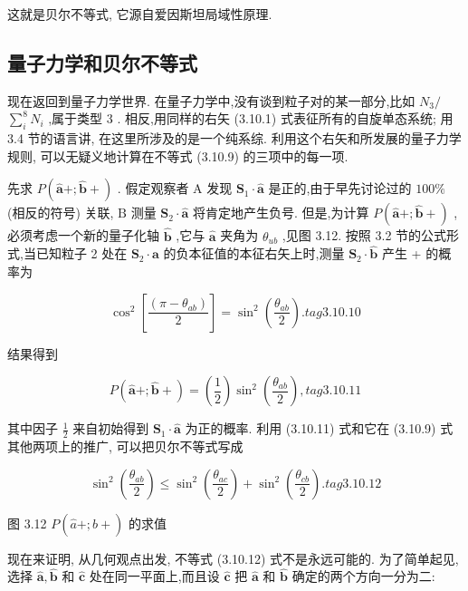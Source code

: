 这就是贝尔不等式, 它源自爱因斯坦局域性原理.

\subsection{量子力学和贝尔不等式}

现在返回到量子力学世界. 在量子力学中,没有谈到粒子对的某一部分,比如 ${N}_{3}/$ $\mathop{\sum }\limits_{i}^{8}{N}_{i}$ ,属于类型 3 . 相反,用同样的右矢 (3.10.1) 式表征所有的自旋单态系统; 用 3.4 节的语言讲, 在这里所涉及的是一个纯系综. 利用这个右矢和所发展的量子力学规则, 可以无疑义地计算在不等式 (3.10.9) 的三项中的每一项.

先求 $P\left( {\widehat{\mathbf{a}}+;\widehat{\mathbf{b}} + }\right)$ . 假定观察者 $\mathrm{A}$ 发现 ${\mathbf{S}}_{1} \cdot \widehat{\mathbf{a}}$ 是正的,由于早先讨论过的 ${100}\%$ (相反的符号) 关联, $\mathrm{B}$ 测量 ${\mathbf{S}}_{2} \cdot \widehat{\mathbf{a}}$ 将肯定地产生负号. 但是,为计算 $P\left( {\widehat{\mathbf{a}}+;\widehat{\mathbf{b}} + }\right)$ ,必须考虑一个新的量子化轴 $\widehat{\mathbf{b}}$ ,它与 $\widehat{\mathbf{a}}$ 夹角为 ${\theta }_{ub}$ ,见图 3.12. 按照 3.2 节的公式形式,当已知粒子 2 处在 ${\mathbf{S}}_{2} \cdot \widehat{\mathbf{a}}$ 的负本征值的本征右矢上时,测量 ${\mathbf{S}}_{2} \cdot \widehat{\mathbf{b}}$ 产生 + 的概率为

$$
{\cos }^{2}\left\lbrack \frac{\left( \pi - {\theta }_{ab}\right) }{2}\right\rbrack = {\sin }^{2}\left( \frac{{\theta }_{ab}}{2}\right) . tag{3.10.10}
$$

结果得到

$$
P\left( {\widehat{\mathbf{a}}+;\widehat{\mathbf{b}} + }\right) = \left( \frac{1}{2}\right) {\sin }^{2}\left( \frac{{\theta }_{ab}}{2}\right) , tag{3.10.11}
$$

其中因子 $\frac{1}{2}$ 来自初始得到 ${\mathbf{S}}_{1} \cdot \widehat{\mathbf{a}}$ 为正的概率. 利用 (3.10.11) 式和它在 (3.10.9) 式其他两项上的推广, 可以把贝尔不等式写成

$$
{\sin }^{2}\left( \frac{{\theta }_{ab}}{2}\right) \leq {\sin }^{2}\left( \frac{{\theta }_{ac}}{2}\right) + {\sin }^{2}\left( \frac{{\theta }_{cb}}{2}\right) . tag{3.10.12}
$$



图 3.12 $P\left( {\widehat{a}+;\widehat{b} + }\right)$ 的求值

现在来证明, 从几何观点出发, 不等式 (3.10.12) 式不是永远可能的. 为了简单起见, 选择 $\widehat{\mathbf{a}},\widehat{\mathbf{b}}$ 和 $\widehat{\mathbf{c}}$ 处在同一平面上,而且设 $\widehat{\mathbf{c}}$ 把 $\widehat{\mathbf{a}}$ 和 $\widehat{\mathbf{b}}$ 确定的两个方向一分为二:


